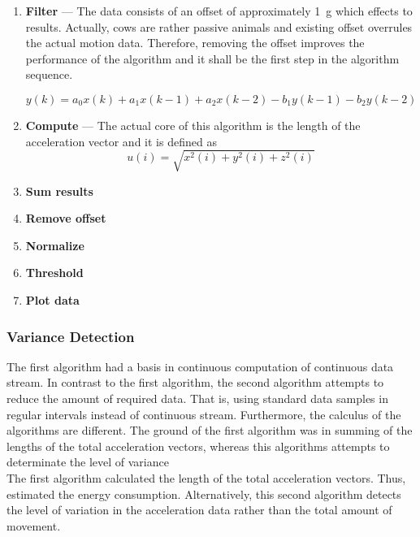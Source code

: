 \documentclass[english,12pt,a4paper,pdftex,elec,utf8]{aaltothesis}
\begin{document}
\begin{enumerate}
\item \textbf{Filter} --- The data consists of an offset of approximately \SI{1}{\gram} which effects to results. Actually, cows are rather passive animals and existing offset overrules the actual motion data. Therefore, removing the offset improves the performance of the algorithm and it shall be the first step in the algorithm sequence.

\begin{equation}
y(k) = a_0 x(k) + a_1 x(k-1) + a_2 x(k-2) - b_1 y(k-1) - b_2 y(k-2)
\end{equation}

\item \textbf{Compute} --- The actual core of this algorithm is the length of the acceleration vector and it is defined as \begin{equation}
u(i) = \sqrt{x^2(i) + y^2(i) + z^2(i)} 
\end{equation}

\item \textbf{Sum results}
\item \textbf{Remove offset}
\item \textbf{Normalize}
\item \textbf{Threshold}
\item \textbf{Plot data}

\end{enumerate}


\subsubsection{Variance Detection} \label{variancedetectionsection}

The first algorithm had a basis in continuous computation of continuous data stream. In contrast to the first algorithm, the second algorithm attempts to reduce the amount of required data. That is, using standard data samples in regular intervals instead of continuous stream. Furthermore, the calculus of the algorithms are different. The ground of the first algorithm was in summing of the lengths of the total acceleration vectors, whereas this algorithms attempts to determinate the level of variance \\


The first algorithm calculated the length of the total acceleration vectors. Thus, estimated the energy consumption. Alternatively, this second algorithm detects the level of variation in the acceleration data rather than the total amount of movement. \\
\end{document}
